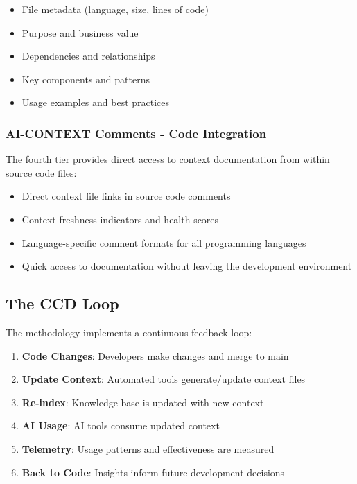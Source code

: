 \documentclass[11pt,a4paper]{article}
\begin{document}
\begin{itemize}
    \item File metadata (language, size, lines of code)
    \item Purpose and business value
    \item Dependencies and relationships
    \item Key components and patterns
    \item Usage examples and best practices
\end{itemize}

\subsubsection{AI-CONTEXT Comments - Code Integration}

The fourth tier provides direct access to context documentation from within source code files:

\begin{itemize}
    \item Direct context file links in source code comments
    \item Context freshness indicators and health scores
    \item Language-specific comment formats for all programming languages
    \item Quick access to documentation without leaving the development environment
\end{itemize}

\subsection{The CCD Loop}

The methodology implements a continuous feedback loop:

\begin{enumerate}
    \item \textbf{Code Changes}: Developers make changes and merge to main
    \item \textbf{Update Context}: Automated tools generate/update context files
    \item \textbf{Re-index}: Knowledge base is updated with new context
    \item \textbf{AI Usage}: AI tools consume updated context
    \item \textbf{Telemetry}: Usage patterns and effectiveness are measured
    \item \textbf{Back to Code}: Insights inform future development decisions
\end{enumerate}
\end{document}
